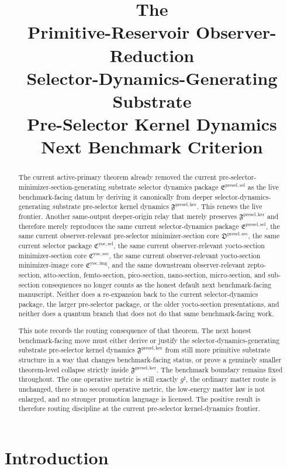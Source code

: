 \documentclass[11pt]{article}
\title{\textbf{The \TheoryName{}}\\[0.4em]
\large Primitive-Reservoir Observer-Reduction\\
\large Selector-Dynamics-Generating Substrate\\
\large Pre-Selector Kernel Dynamics\\
\large Next Benchmark Criterion}
\author{}
\date{}
\newcommand{\CompletedMetric}{g^{\sharp}}
\newcommand{\KernelPackage}{\mathfrak F^{\mathrm{presel,ker}}}
\newcommand{\PreSectionSelectorPackage}{\mathfrak E^{\mathrm{presel,sel}}}
\newcommand{\PreSelectorMinSectionCore}{\mathfrak D^{\mathrm{presel,sec}}}
\newcommand{\YoctoSelectorPackage}{\mathfrak C^{\mathrm{yoc,sel}}}
\newcommand{\YoctoImageCore}{\mathfrak C^{\mathrm{yoc,img}}}
\newcommand{\YoctoMinSectionCore}{\mathfrak C^{\mathrm{yoc,sec}}}
\begin{document}
\maketitle

\begin{abstract}
The current active-primary theorem already removed the current pre-selector-minimizer-section-generating substrate selector dynamics package \(\PreSectionSelectorPackage\) as the live benchmark-facing datum by deriving it canonically from deeper selector-dynamics-generating substrate pre-selector kernel dynamics \(\KernelPackage\). This renews the live frontier. Another same-output deeper-origin relay that merely preserves \(\KernelPackage\) and therefore merely reproduces the same current selector-dynamics package \(\PreSectionSelectorPackage\), the same current observer-relevant pre-selector minimizer-section core \(\PreSelectorMinSectionCore\), the same current selector package \(\YoctoSelectorPackage\), the same current observer-relevant yocto-section minimizer-section core \(\YoctoMinSectionCore\), the same current observer-relevant yocto-section minimizer-image core \(\YoctoImageCore\), and the same downstream observer-relevant zepto-section, atto-section, femto-section, pico-section, nano-section, micro-section, and sub-section consequences no longer counts as the honest default next benchmark-facing manuscript. Neither does a re-expansion back to the current selector-dynamics package, the larger pre-selector package, or the older yocto-section presentations, and neither does a quantum branch that does not do that same benchmark-facing work.

This note records the routing consequence of that theorem. The next honest benchmark-facing move must either derive or justify the selector-dynamics-generating substrate pre-selector kernel dynamics \(\KernelPackage\) from still more primitive substrate structure in a way that changes benchmark-facing status, or prove a genuinely smaller theorem-level collapse strictly inside \(\KernelPackage\). The benchmark boundary remains fixed throughout. The one operative metric is still exactly \(\CompletedMetric\), the ordinary matter route is unchanged, there is no second operative metric, the low-energy matter law is not enlarged, and no stronger promotion language is licensed. The positive result is therefore routing discipline at the current pre-selector kernel-dynamics frontier.
\end{abstract}

\section{Introduction}
\end{document}
